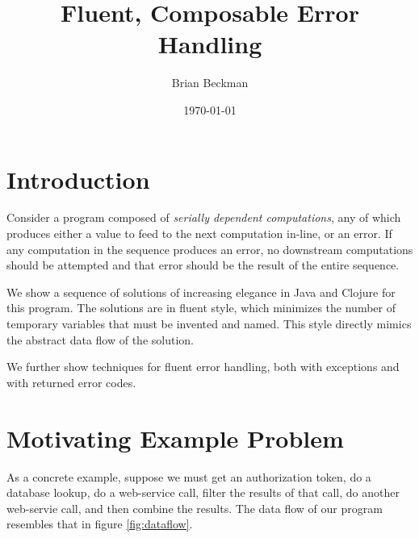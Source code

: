 \documentclass[11pt]{article}
\author{Brian Beckman}
\date{\today}
\title{Fluent, Composable Error Handling}
\begin{document}
\maketitle
\tableofcontents


\section{Introduction}
\label{sec-1}

Consider a program composed of \emph{serially dependent computations},
any of which produces either a value to feed to the next computation
in-line, or an error. If any computation in the sequence produces an
error, no downstream computations should be attempted and that error
should be the result of the entire sequence.

We show a sequence of solutions of increasing elegance in Java and
Clojure for this program. The solutions are in fluent style, which
minimizes the number of temporary variables that must be invented
and named. This style directly mimics the abstract data flow of the
solution.

We further show techniques for fluent error handling, both with
exceptions and with returned error codes.
\section{Motivating Example Problem}
\label{sec-2}

As a concrete example, suppose we must
get an authorization token, do a database lookup, do a web-service
call, filter the results of that call, do another web-servie call,
and then combine the results. The data flow of our program
resembles that in figure \ref{fig:dataflow}.
\end{document}
